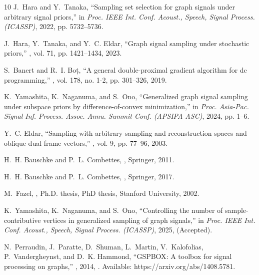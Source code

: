 \documentclass[journal]{IEEEtran}
\begin{document}
\begin{thebibliography}{10}
    J.~Hara and Y.~Tanaka,
    \newblock ``Sampling set selection for graph signals under arbitrary signal priors,''
    \newblock in {\em Proc. IEEE Int. Conf. Acoust., Speech, Signal Process. (ICASSP)}, 2022, pp. 5732--5736.
    
    J.~Hara, Y.~Tanaka, and Y.~C. Eldar,
    \newblock ``Graph signal sampling under stochastic priors,''
    , vol. 71, pp. 1421--1434, 2023.
    
    S.~Banert and R.~I. Boț,
    \newblock ``A general double-proximal gradient algorithm for dc programming,''
    , vol. 178, no. 1-2, pp. 301--326, 2019.
    
    K.~Yamashita, K.~Naganuma, and S.~Ono,
    \newblock ``Generalized graph signal sampling under subspace priors by difference-of-convex minimization,''
    \newblock in {\em Proc. Asia-Pac. Signal Inf. Process. Assoc. Annu. Summit Conf. (APSIPA ASC)}, 2024, pp. 1--6.
    
    Y.~C. Eldar,
    \newblock ``Sampling with arbitrary sampling and reconstruction spaces and oblique dual frame vectors,''
    , vol. 9, pp. 77--96, 2003.
    
    H.~H. Bauschke and P.~L. Combettes,
    ,
    \newblock Springer, 2011.
    
    H.~H. Bauschke and P.~L. Combettes,
    ,
    \newblock Springer, 2017.
    
    M.~Fazel,
    ,
    \newblock Ph.D. thesis, PhD thesis, Stanford University, 2002.
    
    K.~Yamashita, K.~Naganuma, and S.~Ono,
    \newblock ``Controlling the number of sample-contributive vertices in generalized sampling of graph signals,''
    \newblock in {\em Proc. IEEE Int. Conf. Acoust., Speech, Signal Process. (ICASSP)}, 2025,
    \newblock (Accepted).
    
    N.~Perraudin, J.~Paratte, D.~Shuman, L.~Martin, V.~Kalofolias, P.~Vandergheynst, and D.~K. Hammond,
    \newblock ``{GSPBOX}: A toolbox for signal processing on graphs,''
    , 2014,
    \newblock [Online]. Available: https://arxiv.org/abs/1408.5781.
    

\end{thebibliography}
\end{document}
